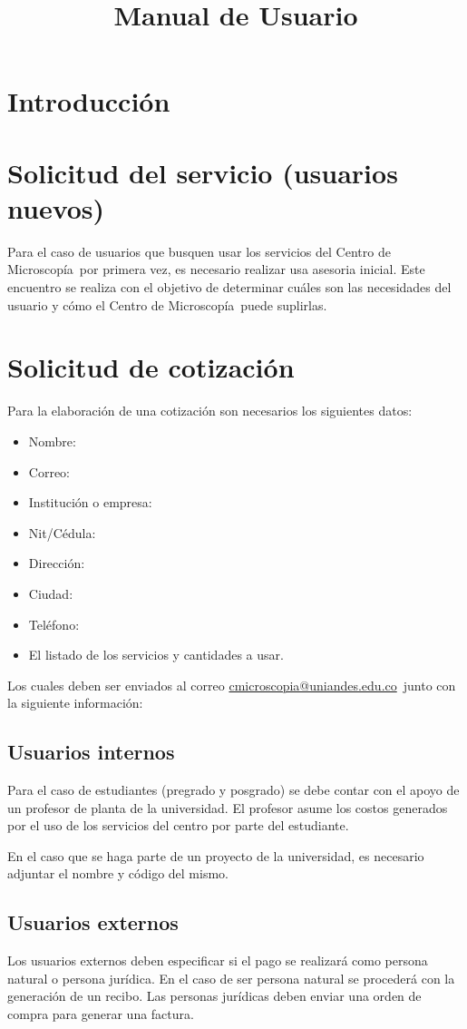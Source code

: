 \documentclass[11pt]{article}
\title{Manual de Usuario}
\makeatletter
\newcommand{\centro}{Centro de Microscop\'ia}
\newcommand{\correo}{\url{cmicroscopia@uniandes.edu.co}}
\makeatother
\begin{document}
	\maketitle
	\tableofcontents
	\newpage
	
	\section{Introducción}
	\section{Solicitud del servicio (usuarios nuevos)}
	Para el caso de usuarios que busquen usar los servicios del \centro\ por primera vez, es necesario realizar usa asesoria inicial. Este encuentro se realiza con el objetivo de determinar cu\'ales son las necesidades del usuario y c\'omo el \centro\ puede suplirlas.
	
	\section{Solicitud de cotizaci\'on}
	Para la elaboraci\'on de una cotizaci\'on son necesarios los siguientes datos:
		\begin{itemize}
			\item Nombre:
			\item Correo:
			\item Instituci\'on o empresa:
			\item Nit/C\'edula:
			\item Direcci\'on:
			\item Ciudad:
			\item Tel\'efono:
			\item El listado de los servicios y cantidades a usar. 
		\end{itemize}
	Los cuales deben ser enviados al correo \correo\ junto con la siguiente informaci\'on:
	
	\subsection{Usuarios internos}
	Para el caso de estudiantes (pregrado y posgrado) se debe contar con el apoyo de un profesor de planta de la universidad. El profesor asume los costos generados por el uso de los servicios del centro por parte del estudiante.
	
	En el caso que se haga parte de un proyecto de la universidad, es necesario adjuntar el nombre y c\'odigo del mismo.
	\subsection{Usuarios externos}
	Los usuarios externos deben especificar si el pago se realizar\'a como persona natural o persona jur\'idica. En el caso de ser persona natural se proceder\'a con la generaci\'on de un recibo. Las personas jur\'idicas deben enviar una orden de compra para generar una factura.
	
\end{document}
